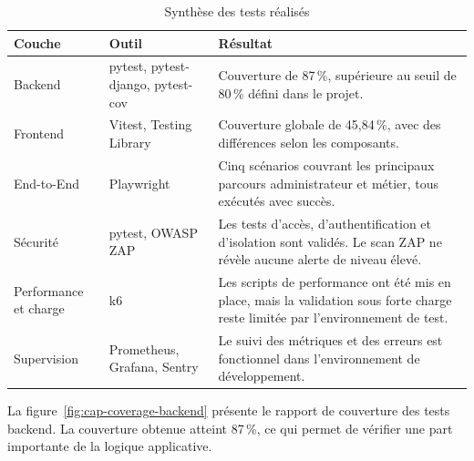 \begin{table}[H]

\centering

\caption{Synthèse des tests réalisés}

\label{tab:synthese-tests}

\footnotesize

\begin{tabular}{|p{3.5cm}|p{3.8cm}|p{6cm}|}

\hline

\rowcolor{gray!20}

\textbf{Couche} &
\textbf{Outil} &
\textbf{Résultat} \\

\hline

Backend &
pytest, pytest-django, pytest-cov &
Couverture de 87\,\%, supérieure au seuil de 80\,\% défini dans le projet. \\

\hline

Frontend &
Vitest, Testing Library &
Couverture globale de 45,84\,\%, avec des différences selon les composants. \\

\hline

End-to-End &
Playwright &
Cinq scénarios couvrant les principaux parcours administrateur et métier, tous exécutés avec succès. \\

\hline

Sécurité &
pytest, OWASP ZAP &
Les tests d'accès, d'authentification et d'isolation sont validés. Le scan ZAP ne révèle aucune alerte de niveau élevé. \\

\hline

Performance et charge &
k6 &
Les scripts de performance ont été mis en place, mais la validation sous forte charge reste limitée par l'environnement de test. \\

\hline

Supervision &
Prometheus, Grafana, Sentry &
Le suivi des métriques et des erreurs est fonctionnel dans l'environnement de développement. \\

\hline

\end{tabular}

\end{table}

La figure~\ref{fig:cap-coverage-backend} présente le rapport de couverture des tests backend. La couverture obtenue atteint 87\,\%, ce qui permet de vérifier une part importante de la logique applicative.

